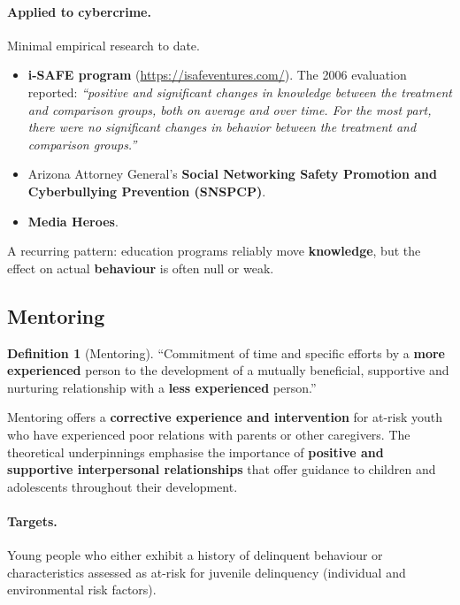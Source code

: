 \documentclass[11pt,a4paper,openany]{report}
\theoremstyle{definition}
\newtheorem{definition}{Definition}[chapter]
\theoremstyle{plain}
\theoremstyle{remark}
\begin{document}
\paragraph{Applied to cybercrime.} Minimal empirical research to date.
\begin{itemize}
    \item \textbf{i-SAFE program} (\url{https://isafeventures.com/}). The 2006 evaluation reported: \textit{``positive and significant changes in knowledge between the treatment and comparison groups, both on average and over time. For the most part, there were no significant changes in behavior between the treatment and comparison groups.''}
    \item Arizona Attorney General's \textbf{Social Networking Safety Promotion and Cyberbullying Prevention (SNSPCP)}.
    \item \textbf{Media Heroes}.
\end{itemize}

\begin{keypoint}
A recurring pattern: education programs reliably move \textbf{knowledge}, but the effect on actual \textbf{behaviour} is often null or weak.
\end{keypoint}

\subsection{Mentoring}

\begin{definition}[Mentoring]
``Commitment of time and specific efforts by a \textbf{more experienced} person to the development of a mutually beneficial, supportive and nurturing relationship with a \textbf{less experienced} person.''
\end{definition}

Mentoring offers a \textbf{corrective experience and intervention} for at-risk youth who have experienced poor relations with parents or other caregivers. The theoretical underpinnings emphasise the importance of \textbf{positive and supportive interpersonal relationships} that offer guidance to children and adolescents throughout their development.

\paragraph{Targets.} Young people who either exhibit a history of delinquent behaviour or characteristics assessed as at-risk for juvenile delinquency (individual and environmental risk factors).
\end{document}
